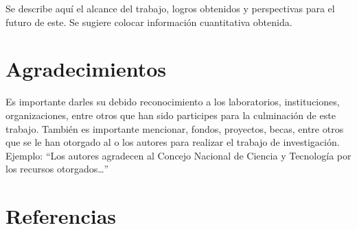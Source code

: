     Se describe aquí el alcance del trabajo, logros obtenidos y perspectivas para el futuro de este. Se sugiere colocar información cuantitativa obtenida.
    
    \section{Agradecimientos}
    
    Es importante darles su debido reconocimiento a los laboratorios, instituciones, organizaciones, entre otros que han sido participes para la culminación de este trabajo. También es importante mencionar, fondos, proyectos, becas, entre otros que se le han otorgado al o los autores para realizar el trabajo de investigación. Ejemplo: “Los autores agradecen al Concejo Nacional de Ciencia y Tecnología por los recursos otorgados…”
    
    \section*{Referencias}
    
    
    
    
    
    
    
    
    
    
    
    
